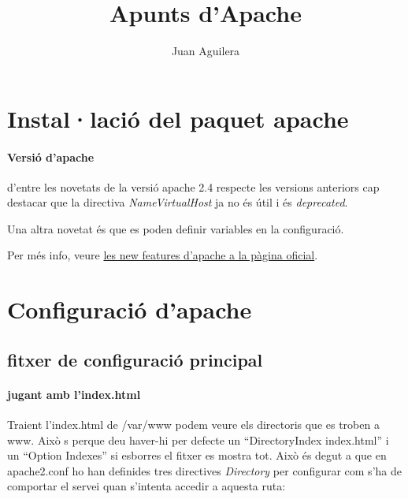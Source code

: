 \documentclass[a4paper, 11pt]{article}
\begin{document}
\title{Apunts d'Apache}
\author{Juan Aguilera}
\maketitle

\section{Instal·laci\'o del paquet apache}
\paragraph{Versió d'apache \\}


d'entre les novetats de la versió apache 2.4 respecte les versions anteriors cap destacar que la directiva \textit{NameVirtualHost} ja no \'es útil i \'es \textit{deprecated}.

Una altra novetat \'es que es poden definir variables en la configuració.

Per m\'es info, veure \href{https://httpd.apache.org/docs/2.4/new_features_2_4.html}{les new features d'apache a la pàgina oficial}\cite{DOC}.

\section{Configuració d'apache}
\subsection{fitxer de configuració principal}
\paragraph{jugant amb l'index.html }
Traient l'index.html de /var/www podem veure els directoris que es troben a www. Això s perque deu haver-hi per defecte un “DirectoryIndex index.html” i un “Option Indexes” si esborres el fitxer es mostra tot. Això \'es degut a que en apache2.conf ho han definides tres directives \textit{Directory} per configurar com s'ha de comportar el servei quan s'intenta accedir a aquesta ruta:
\end{document}
